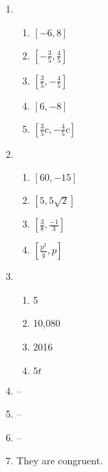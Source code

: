 \documentclass{article}
\begin{document}
\begin{enumerate}
\item

	\begin{enumerate}
	
	\item $[-6, 8]$
	
	\item $[-\frac{3}{5}, \frac{4}{5}]$
	
	\item $[\frac{3}{5}, -\frac{4}{5}]$
	
	\item $[6, -8]$
	
	\item $[\frac{3}{5}c, -\frac{4}{5}c]$
	
	\end{enumerate}
	
\item

	\begin{enumerate}
	
	\item $[60, -15]$
	
	\item $[5, 5\sqrt{2}]$
	
	\item $[\frac{3}{8}, \frac{-1}{3}]$
	
	\item $[\frac{p^2}{q}, p]$
	
	\end{enumerate}
	
\item

	\begin{enumerate}
	
	\item 5
	
	\item 10,080
	
	\item 2016
	
	\item $5t$
	
	\end{enumerate}
	
\item --

\item --

\item --

\item They are congruent.


\end{enumerate}
\end{document}
